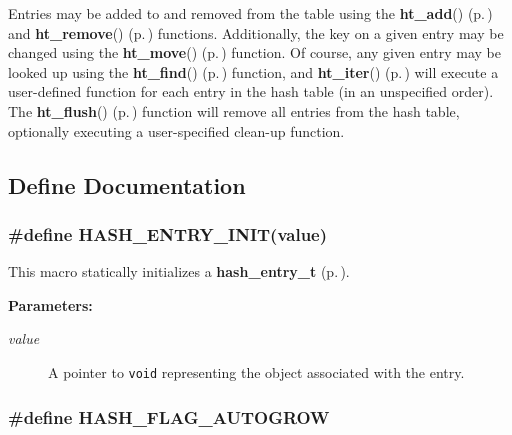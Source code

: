 Entries may be added to and removed from the table using the {\bf ht\_\-add}() {\rm (p.\,\pageref{group__dbprim__hash_a7})} and {\bf ht\_\-remove}() {\rm (p.\,\pageref{group__dbprim__hash_a9})} functions. Additionally, the key on a given entry may be changed using the {\bf ht\_\-move}() {\rm (p.\,\pageref{group__dbprim__hash_a8})} function. Of course, any given entry may be looked up using the {\bf ht\_\-find}() {\rm (p.\,\pageref{group__dbprim__hash_a10})} function, and {\bf ht\_\-iter}() {\rm (p.\,\pageref{group__dbprim__hash_a11})} will execute a user-defined function for each entry in the hash table (in an unspecified order). The {\bf ht\_\-flush}() {\rm (p.\,\pageref{group__dbprim__hash_a12})} function will remove all entries from the hash table, optionally executing a user-specified clean-up function. 

\subsection{Define Documentation}
\subsubsection{\setlength{\rightskip}{0pt plus 5cm}\#define HASH\_\-ENTRY\_\-INIT(value)}\label{group__dbprim__hash_a29}




 This macro statically initializes a {\bf hash\_\-entry\_\-t} {\rm (p.\,\pageref{group__dbprim__hash_a1})}.\begin{Desc}
\item[{\bf Parameters: }]\par
\begin{description}
\item[
{\em value}]A pointer to {\tt void} representing the object associated with the entry. \end{description}
\end{Desc}
\subsubsection{\setlength{\rightskip}{0pt plus 5cm}\#define HASH\_\-FLAG\_\-AUTOGROW}\label{group__dbprim__hash_a16}




